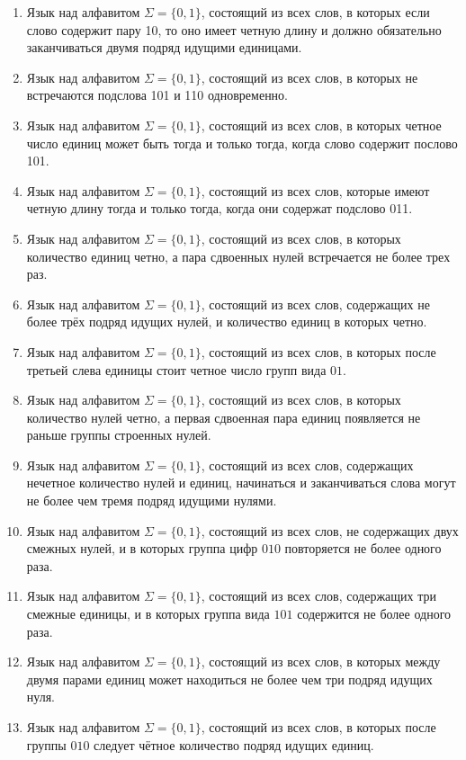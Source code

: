 \begin{enumerate}
\item Язык над алфавитом $\Sigma=\{0,1\}$, состоящий из всех слов, в которых если слово содержит пару 10, то оно имеет четную длину и должно обязательно заканчиваться двумя подряд идущими единицами.
\item Язык над алфавитом $\Sigma=\{0,1\}$, состоящий из всех слов, в которых не встречаются подслова 101 и 110 одновременно.
\item Язык над алфавитом $\Sigma=\{0,1\}$, состоящий из всех слов, в которых четное число единиц может быть тогда и только тогда, когда слово содержит послово 101.
\item Язык над алфавитом $\Sigma=\{0,1\}$, состоящий из всех слов, которые имеют четную длину тогда и только тогда, когда они содержат подслово 011.
    
\item Язык над алфавитом $\Sigma=\{0,1\}$, состоящий из всех слов, в которых количество единиц четно, а пара сдвоенных нулей встречается не более трех раз.
\item Язык над алфавитом $\Sigma=\{0,1\}$, состоящий из всех слов, содержащих не более трёх подряд идущих нулей, и количество единиц в которых четно.
\item Язык над алфавитом $\Sigma=\{0,1\}$, состоящий из всех слов, в которых после третьей слева единицы стоит четное число групп вида $01$.
\item Язык над алфавитом $\Sigma=\{0,1\}$, состоящий из всех слов, в которых количество нулей четно, а первая сдвоенная пара единиц появляется не раньше группы строенных нулей.
\item Язык над алфавитом $\Sigma=\{0,1\}$, состоящий из всех слов, содержащих нечетное количество нулей и единиц, начинаться и заканчиваться слова могут не более чем тремя подряд идущими нулями.
\item Язык над алфавитом $\Sigma=\{0,1\}$, состоящий из всех слов, не содержащих двух смежных нулей, и в которых группа цифр $010$ повторяется не более одного раза.
\item Язык над алфавитом $\Sigma=\{0,1\}$, состоящий из всех слов, содержащих три смежные единицы, и в которых группа вида $101$ содержится не более одного раза.
\item Язык над алфавитом $\Sigma=\{0,1\}$, состоящий из всех слов, в которых между двумя парами единиц может находиться не более чем три подряд идущих нуля.
\item Язык над алфавитом $\Sigma=\{0,1\}$, состоящий из всех слов, в которых после группы $010$ следует чётное количество подряд идущих единиц. 

\end{enumerate}
